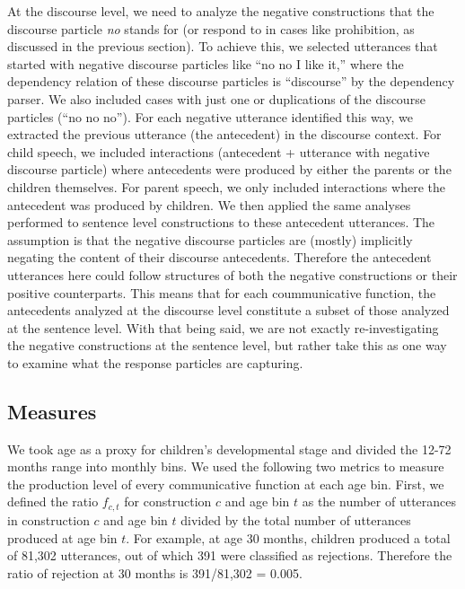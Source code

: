 \documentclass[
  english,
  man,floatsintext]{apa6}
\begin{document}
At the discourse level, we need to analyze the negative constructions that the discourse particle \emph{no} stands for (or respond to in cases like prohibition, as discussed in the previous section). To achieve this, we selected utterances that started with negative discourse particles like ``no no I like it,'' where the dependency relation of these discourse particles is ``discourse'' by the dependency parser. We also included cases with just one or duplications of the discourse particles (``no no no''). For each negative utterance identified this way, we extracted the previous utterance (the antecedent) in the discourse context. For child speech, we included interactions (antecedent + utterance with negative discourse particle) where antecedents were produced by either the parents or the children themselves. For parent speech, we only included interactions where the antecedent was produced by children. We then applied the same analyses performed to sentence level constructions to these antecedent utterances. The assumption is that the negative discourse particles are (mostly) implicitly negating the content of their discourse antecedents. Therefore the antecedent utterances here could follow structures of both the negative constructions or their positive counterparts. This means that for each coummunicative function, the antecedents analyzed at the discourse level constitute a subset of those analyzed at the sentence level. With that being said, we are not exactly re-investigating the negative constructions at the sentence level, but rather take this as one way to examine what the response particles are capturing.

\hypertarget{measures}{%
\subsection{Measures}\label{measures}}

We took age as a proxy for children's developmental stage and divided the 12-72 months range into monthly bins. We used the following two metrics to measure the production level of every communicative function at each age bin. First, we defined the ratio \(f_{c,t}\) for construction \(c\) and age bin \(t\) as the number of utterances in construction \(c\) and age bin \(t\) divided by the total number of utterances produced at age bin \(t\). For example, at age 30 months, children produced a total of 81,302 utterances, out of which 391 were classified as rejections. Therefore the ratio of rejection at 30 months is 391/81,302 = 0.005.
\end{document}
